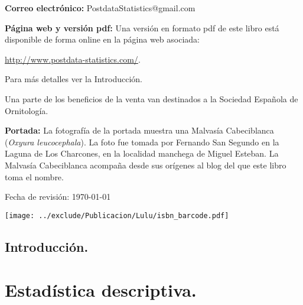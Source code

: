\documentclass[10pt,a4paper]{book}
\begin{document}
\vspace{0.15cm}

\noindent
{\bf Correo electrónico:} PostdataStatistics@gmail.com


\noindent
{\bf Página web y versión pdf:}  
Una versión en formato pdf de este libro está disponible de forma online 
en la página web asociada:\\
\begin{center}
\url{http://www.postdata-statistics.com/}.
\end{center}
Para más detalles ver la Introducción.


\noindent Una parte de los beneficios de la venta van destinados a la Sociedad Española de Ornitología.\\

\vfill

\vspace{0.3cm}

\noindent
{\bf Portada:} La fotografía de la portada muestra una Malvasía Cabeciblanca ({\em Oxyura leucocephala}).
La foto fue tomada por Fernando San Segundo en la Laguna de Los Charcones, en la
localidad manchega de Miguel Esteban. La Malvasía Cabeciblanca acompaña desde
sus orígenes al blog del que este libro toma el nombre. \\

\vspace{1cm}

\noindent Fecha de revisión: \today \\

\normalsize

\begin{center}
\texttt{[image: ../exclude/Publicacion/Lulu/isbn\_barcode.pdf]}
\end{center}


\setcounter{tocdepth}{1}
\tableofcontents

\chapter*{Introducción.}



\pagestyle{empty}
\newpage


\mainmatter

\part{Estadística descriptiva.}
\label{parte:EstadisticaDescriptiva}
\end{document}
